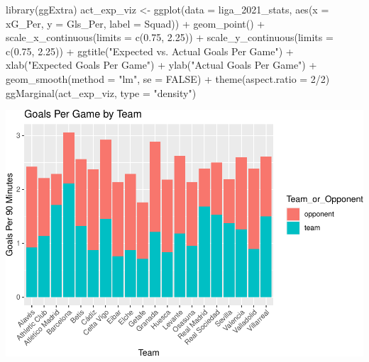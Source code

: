 \documentclass[
  11pt,
]{book}
\newenvironment{Shaded}{\begin{snugshade}}{\end{snugshade}}
\newcommand{\AttributeTok}[1]{\textcolor[rgb]{0.77,0.63,0.00}{#1}}
\newcommand{\ConstantTok}[1]{\textcolor[rgb]{0.00,0.00,0.00}{#1}}
\newcommand{\DecValTok}[1]{\textcolor[rgb]{0.00,0.00,0.81}{#1}}
\newcommand{\FloatTok}[1]{\textcolor[rgb]{0.00,0.00,0.81}{#1}}
\newcommand{\FunctionTok}[1]{\textcolor[rgb]{0.00,0.00,0.00}{#1}}
\newcommand{\NormalTok}[1]{#1}
\newcommand{\OtherTok}[1]{\textcolor[rgb]{0.56,0.35,0.01}{#1}}
\newcommand{\SpecialCharTok}[1]{\textcolor[rgb]{0.00,0.00,0.00}{#1}}
\newcommand{\StringTok}[1]{\textcolor[rgb]{0.31,0.60,0.02}{#1}}
\theoremstyle{definition}
\theoremstyle{definition}
\theoremstyle{definition}
\theoremstyle{definition}
\theoremstyle{remark}
\begin{document}
\begin{Shaded}
\begin{Highlighting}[]
\FunctionTok{library}\NormalTok{(ggExtra)}
\NormalTok{act\_exp\_viz }\OtherTok{\textless{}{-}} \FunctionTok{ggplot}\NormalTok{(}\AttributeTok{data =}\NormalTok{ liga\_2021\_stats, }\FunctionTok{aes}\NormalTok{(}\AttributeTok{x =}\NormalTok{ xG\_Per, }\AttributeTok{y =}\NormalTok{ Gls\_Per, }\AttributeTok{label =}\NormalTok{ Squad)) }\SpecialCharTok{+}
    \FunctionTok{geom\_point}\NormalTok{() }\SpecialCharTok{+} \FunctionTok{scale\_x\_continuous}\NormalTok{(}\AttributeTok{limits =} \FunctionTok{c}\NormalTok{(}\FloatTok{0.75}\NormalTok{, }\FloatTok{2.25}\NormalTok{)) }\SpecialCharTok{+} \FunctionTok{scale\_y\_continuous}\NormalTok{(}\AttributeTok{limits =} \FunctionTok{c}\NormalTok{(}\FloatTok{0.75}\NormalTok{,}
    \FloatTok{2.25}\NormalTok{)) }\SpecialCharTok{+} \FunctionTok{ggtitle}\NormalTok{(}\StringTok{"Expected vs. Actual Goals Per Game"}\NormalTok{) }\SpecialCharTok{+} \FunctionTok{xlab}\NormalTok{(}\StringTok{"Expected Goals Per Game"}\NormalTok{) }\SpecialCharTok{+}
    \FunctionTok{ylab}\NormalTok{(}\StringTok{"Actual Goals Per Game"}\NormalTok{) }\SpecialCharTok{+} \FunctionTok{geom\_smooth}\NormalTok{(}\AttributeTok{method =} \StringTok{"lm"}\NormalTok{, }\AttributeTok{se =} \ConstantTok{FALSE}\NormalTok{) }\SpecialCharTok{+} \FunctionTok{theme}\NormalTok{(}\AttributeTok{aspect.ratio =} \DecValTok{2}\SpecialCharTok{/}\DecValTok{2}\NormalTok{)}
\FunctionTok{ggMarginal}\NormalTok{(act\_exp\_viz, }\AttributeTok{type =} \StringTok{"density"}\NormalTok{)}
\end{Highlighting}
\end{Shaded}

\includegraphics{series_files/figure-latex/unnamed-chunk-42-1.pdf}
\end{document}
